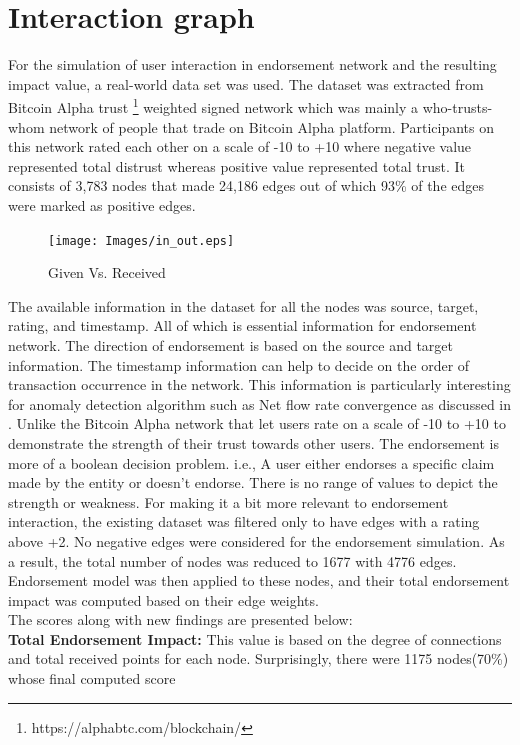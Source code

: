 \section{Interaction graph} \label{sec:interaction}
For the simulation of user interaction in endorsement network and the resulting
impact value, a real-world data set was used. The dataset was extracted from
Bitcoin Alpha trust  \footnote{https://alphabtc.com/blockchain/} weighted
signed network which was mainly a who-trusts-whom network of people that trade
on Bitcoin Alpha platform. Participants on this network rated each other on a
scale of -10 to +10 where negative value represented total distrust whereas
positive value represented total trust. It consists of 3,783 nodes that made
24,186 edges out of which 93\% of the edges were marked as positive
edges\cite{kumar2016edge}.\\
\begin{figure}
	\texttt{[image: Images/in\_out.eps]} 
	\caption{Given Vs. Received} 
	\label{inOut}
\end{figure}
The available information in the dataset for all the nodes was source, target,
rating, and timestamp. All of which is essential information for endorsement
network. The direction of endorsement is based on the source and target
information.  The timestamp information can help to decide on the order of
transaction occurrence in the network. This information is particularly
interesting for anomaly detection algorithm such as Net flow rate convergence
as discussed in \cite{buechler2015decentralized}.
Unlike the Bitcoin Alpha network that let users rate on a scale of -10 to +10
to demonstrate the strength of their trust towards other users. The endorsement
is more of a boolean decision problem. i.e., A user either endorses a specific
claim made by the entity or doesn't endorse. There is no range of values to
depict the strength or weakness. For making it a bit more relevant to
endorsement interaction, the existing dataset was filtered only to have edges
with a rating above +2. No negative edges were considered for the endorsement
simulation. As a result, the total number of nodes was reduced to 1677 with
4776 edges. Endorsement model was then applied to these nodes, and their total
endorsement impact was computed based on their edge weights. \\
The scores along with new findings are presented below: \\
\textbf{Total Endorsement Impact:} 
This value is based on the degree of connections and total received points for
each node. Surprisingly, there were 1175 nodes(70\%) whose final computed score
